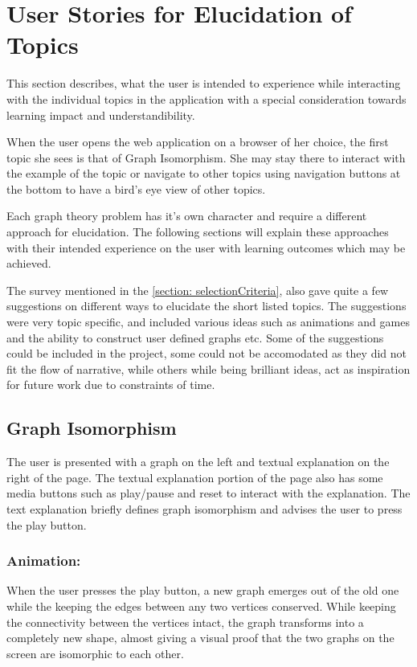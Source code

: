 \section{User Stories for Elucidation of Topics}

This section describes, what the user is intended to experience while
interacting with the individual topics in the application with a special
consideration towards learning impact and understandibility.

When the user opens the web application on a browser of her choice, the first
topic she sees is that of Graph Isomorphism. She may stay there to interact
with the example of the topic or navigate to other topics using navigation
buttons at the bottom to have a bird's eye view of other topics.

Each graph theory problem has it's own character and require a different
approach for elucidation. The following sections will explain these approaches
with their intended experience on the user with learning outcomes which may be
achieved.

The survey mentioned in the \autoref{section: selectionCriteria}, also gave
quite a few suggestions on different ways to elucidate the short listed topics.
The suggestions were very topic specific, and included various ideas such as
animations and games and the ability to construct user defined graphs etc. Some
of the suggestions could be included in the project, some could not be
accomodated as they did not fit the flow of narrative, while others while being
brilliant ideas, act as inspiration for future work due to constraints of time.

\subsection{Graph Isomorphism}
The user is presented with a graph on the left and textual explanation on the
right of the page.  The textual explanation portion of the page also has some
media buttons such as play/pause and reset to interact with the explanation.
The text explanation briefly defines graph isomorphism and advises the user to
press the play button.

\subsubsection{Animation:}
When the user presses the play button, a new graph emerges out of the old one
while the keeping the edges between any two vertices conserved. While keeping
the connectivity between the vertices intact, the graph transforms into a
completely new shape, almost giving a visual proof that the two graphs on the
screen are isomorphic to each other.

